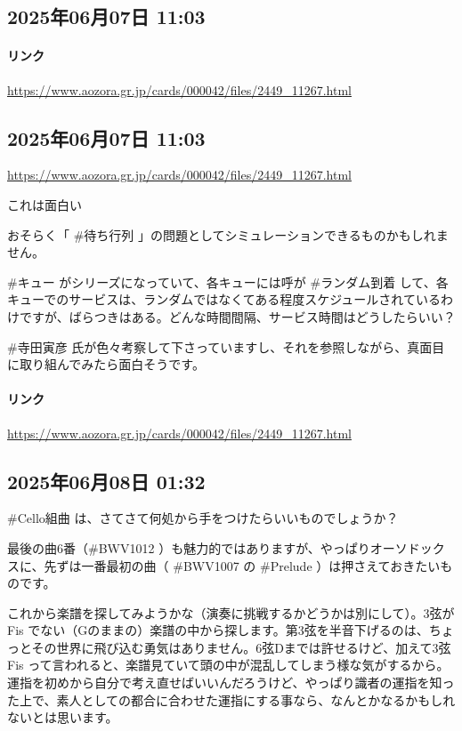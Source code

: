 \subsection*{2025年06月07日 11:03}

\paragraph{リンク}
\url{https://www.aozora.gr.jp/cards/000042/files/2449_11267.html}

\subsection*{2025年06月07日 11:03}

\url{https://www.aozora.gr.jp/cards/000042/files/2449_11267.html}

これは面白い🤣

おそらく「 \#待ち行列 」の問題としてシミュレーションできるものかもしれません。

\#キュー がシリーズになっていて、各キューには呼が \#ランダム到着 して、各キューでのサービスは、ランダムではなくてある程度スケジュールされているわけですが、ばらつきはある。どんな時間間隔、サービス時間はどうしたらいい？

\#寺田寅彦 氏が色々考察して下さっていますし、それを参照しながら、真面目に取り組んでみたら面白そうです。

\paragraph{リンク}
\url{https://www.aozora.gr.jp/cards/000042/files/2449_11267.html}

\subsection*{2025年06月08日 01:32}

\#Cello組曲 は、さてさて何処から手をつけたらいいものでしょうか？

最後の曲6番（\#BWV1012 ）も魅力的ではありますが、やっぱりオーソドックスに、先ずは一番最初の曲（ \#BWV1007 の \#Prelude ）は押さえておきたいものです。

これから楽譜を探してみようかな（演奏に挑戦するかどうかは別にして）。3弦がFis でない（Gのままの）楽譜の中から探します。第3弦を半音下げるのは、ちょっとその世界に飛び込む勇気はありません。6弦Dまでは許せるけど、加えて3弦Fis って言われると、楽譜見ていて頭の中が混乱してしまう様な気がするから。運指を初めから自分で考え直せばいいんだろうけど、やっぱり識者の運指を知った上で、素人としての都合に合わせた運指にする事なら、なんとかなるかもしれないとは思います。

